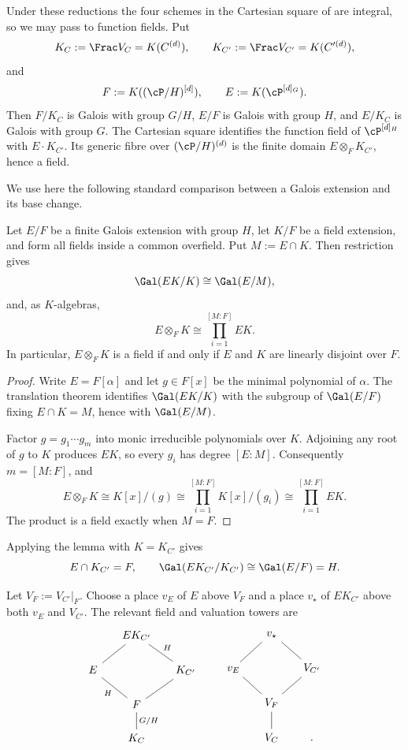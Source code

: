 Under these reductions the four schemes in the Cartesian square of
 are integral, so we may pass to function
fields. Put
\[
K_C:=\Frac V_C=K(C^{(d)}),\qquad
K_{C'}:=\Frac V_{C'}=K(C'^{(d)}),
\]
and
\[
F:=K((\cP/H)^{[d]}),\qquad
E:=K(\cP^{[d]_G}).
\]
Then $F/K_C$ is Galois with group $G/H$, $E/F$ is Galois with group $H$,
and $E/K_C$ is Galois with group $G$. The Cartesian square identifies the
function field of $\cP^{[d]_H}$ with $E\cdot K_{C'}$. Its generic fibre over
$(\cP/H)^{(d)}$ is the finite domain $E\otimes_FK_{C'}$, hence a field.

We use here the following standard comparison between a Galois extension and
its base change.

\begin{lemma}\label{lem:galois-base-change}
Let $E/F$ be a finite Galois extension with group $H$, let $K/F$ be a field
extension, and form all fields inside a common overfield. Put $M:=E\cap K$.
Then restriction gives
\[
\Gal(EK/K)\cong\Gal(E/M),
\]
and, as $K$-algebras,
\[
E\otimes_FK\cong\prod_{i=1}^{[M:F]}EK.
\]
In particular, $E\otimes_FK$ is a field if and only if $E$ and $K$ are
linearly disjoint over $F$.
\end{lemma}

\begin{proof}
Write $E=F[\alpha]$ and let $g\in F[x]$ be the minimal polynomial of
$\alpha$. The translation theorem identifies $\Gal(EK/K)$ with the subgroup
of $\Gal(E/F)$ fixing $E\cap K=M$, hence with $\Gal(E/M)$.

Factor $g=g_1\cdots g_m$ into monic irreducible polynomials over $K$.
Adjoining any root of $g$ to $K$ produces $EK$, so every $g_i$ has degree
$[E:M]$. Consequently $m=[M:F]$, and
\[
E\otimes_FK\cong K[x]/(g)
  \cong\prod_{i=1}^{[M:F]}K[x]/(g_i)
  \cong\prod_{i=1}^{[M:F]}EK.
\]
The product is a field exactly when $M=F$.
\end{proof}

Applying the lemma with $K=K_{C'}$ gives
\[
E\cap K_{C'}=F,
\qquad
\Gal(EK_{C'}/K_{C'})\cong\Gal(E/F)=H.
\]

Let $V_F:=V_{C'}|_F$. Choose a place $v_E$ of $E$ above $V_F$ and a place
$v_\star$ of $EK_{C'}$ above both $v_E$ and $V_{C'}$. The relevant field
and valuation towers are
\[
\begin{tikzcd}[row sep=1.6em, column sep=1.4em]
 &EK_{C'}\arrow[dl,dash]\arrow[dr,dash,"H"]&\\
 E\arrow[dr,dash,"H"']&&K_{C'}\arrow[dl,dash]\\
 &F\arrow[d,dash,"G/H"]&\\
 &K_C&
\end{tikzcd}
\qquad
\begin{tikzcd}[row sep=1.6em, column sep=1.4em]
 &v_\star\arrow[dl,dash]\arrow[dr,dash]&\\
 v_E\arrow[dr,dash]&&V_{C'}\arrow[dl,dash]\\
 &V_F\arrow[d,dash]&\\
 &V_C&.
\end{tikzcd}
\]

